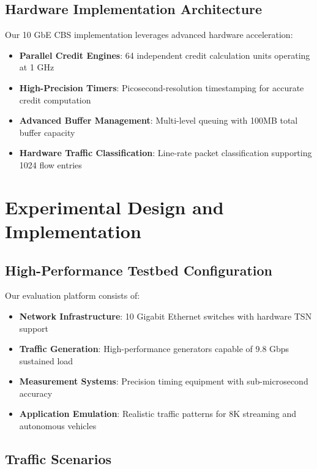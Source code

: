 \documentclass[10pt, journal, compsoc]{IEEEtran}
\begin{document}
\subsection{Hardware Implementation Architecture}

Our 10 GbE CBS implementation leverages advanced hardware acceleration:

\begin{itemize}
    \item \textbf{Parallel Credit Engines}: 64 independent credit calculation units operating at 1 GHz
    \item \textbf{High-Precision Timers}: Picosecond-resolution timestamping for accurate credit computation
    \item \textbf{Advanced Buffer Management}: Multi-level queuing with 100MB total buffer capacity
    \item \textbf{Hardware Traffic Classification}: Line-rate packet classification supporting 1024 flow entries
\end{itemize}

\section{Experimental Design and Implementation}

\subsection{High-Performance Testbed Configuration}

Our evaluation platform consists of:

\begin{itemize}
    \item \textbf{Network Infrastructure}: 10 Gigabit Ethernet switches with hardware TSN support
    \item \textbf{Traffic Generation}: High-performance generators capable of 9.8 Gbps sustained load
    \item \textbf{Measurement Systems}: Precision timing equipment with sub-microsecond accuracy
    \item \textbf{Application Emulation}: Realistic traffic patterns for 8K streaming and autonomous vehicles
\end{itemize}

\subsection{Traffic Scenarios}
\end{document}
